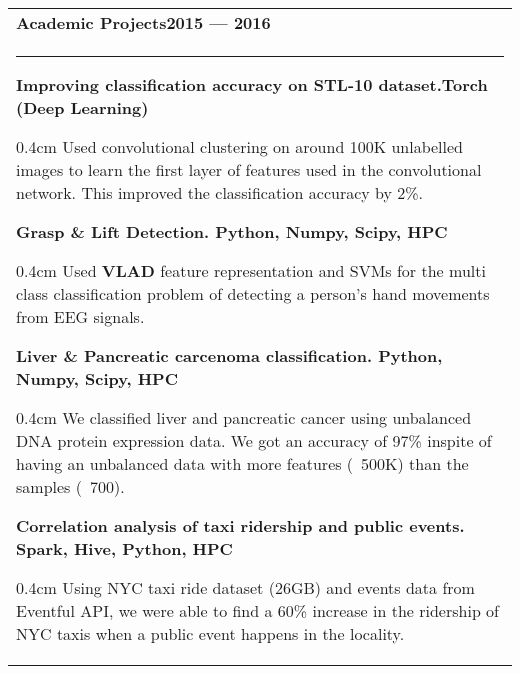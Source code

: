 \documentclass{article}
\newenvironment{projectdescription}{\begin{adjustwidth}{0.4cm}{}}{\end{adjustwidth}}
\begin{document}
\begin{tabular}{p{\dimexpr\linewidth-2\tabcolsep}}
	\bfseries \large{Academic Projects}\hfill 2015 --- 2016 \mdseries \\
	\noindent\rule{\textwidth}{0.4pt}
	\bfseries Improving classification accuracy on STL-10 dataset.\mdseries \hfill Torch (Deep Learning)

	\begin{projectdescription}
	Used convolutional clustering on around 100K unlabelled images to learn the first layer of features used in the convolutional network.  
	This improved the classification accuracy by 2\%.
	\end{projectdescription}
	\smallskip

	\bfseries Grasp \& Lift Detection. \mdseries \hfill Python, Numpy, Scipy, HPC 
	\begin{projectdescription}
	Used \textbf{VLAD} feature representation and SVMs for the multi class classification problem of detecting a person's hand movements from EEG signals.
	\end{projectdescription}
	\smallskip

	\bfseries Liver \& Pancreatic carcenoma classification.  \mdseries\hfill Python, Numpy, Scipy, HPC
	\begin{projectdescription}
			We classified liver and pancreatic cancer using unbalanced DNA protein expression data.  We got an accuracy of 97\% inspite of having an unbalanced data with more features (~500K) than the samples (~700).
	\end{projectdescription}

	\smallskip

	\bfseries Correlation analysis of taxi ridership and public events. \mdseries \hfill Spark, Hive, Python, HPC
	\begin{projectdescription}
			Using NYC taxi ride dataset (26GB) and events data from Eventful API, we were able to find a 60\% increase in the ridership of NYC taxis when a public event happens in the locality.
	\end{projectdescription}
\end{tabular}
\bigskip
\end{document}
